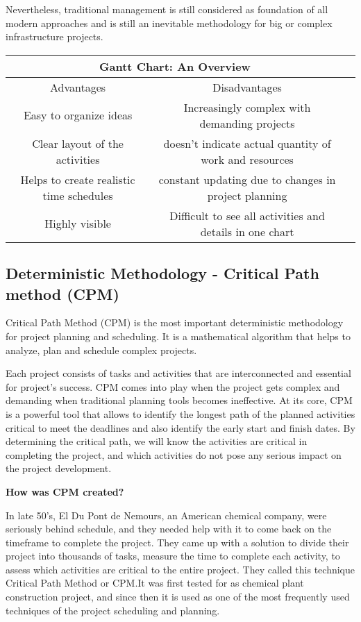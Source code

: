 Nevertheless, traditional management is still considered as foundation of all modern approaches and is still an inevitable methodology for big or complex infrastructure projects.
\\

\begin{tabular}{ |c|c|c| } 
	\hline
	\multicolumn{2}{|c|}{ Gantt Chart: An Overview} \\
	\hline
	Advantages & Disadvantages \\
	\hline
	Easy to organize ideas & Increasingly complex with demanding projects\\
	\hline
	Clear layout of the activities &  doesn't indicate actual quantity of work and resources \\
	\hline
	Helps to create realistic time schedules &constant updating due to changes in project planning \\
	\hline
	Highly visible  & Difficult to see all activities and details in one chart  \\
	\hline
\end{tabular}




\subsection{Deterministic Methodology - Critical Path method (CPM)}

Critical Path Method (CPM) is the most important deterministic methodology for project planning and scheduling. It is a mathematical algorithm that helps to analyze, plan and schedule complex projects.

Each project consists of tasks and activities that are interconnected and essential for project's success. CPM comes into play when the project gets complex and demanding when traditional planning tools becomes ineffective. At its core, CPM is a powerful tool that allows to identify the longest path of the planned activities critical to meet the deadlines and also identify the early start and finish dates. By determining the critical path, we will know the activities are critical in completing the project, and which activities do not pose any serious impact on the project development.

\textbf{How was CPM created? }

In late 50's, El Du Pont de Nemours, an American chemical company, were seriously behind schedule, and they needed help with it to come back on the timeframe to complete the project. They came up with a solution to divide their project into thousands of tasks, measure the time to complete each activity, to assess which activities are critical to the entire project. They called this technique Critical Path Method or CPM.It was first tested for as chemical plant construction project, and since then it is used as one of the most frequently used techniques of the project scheduling and planning. 

